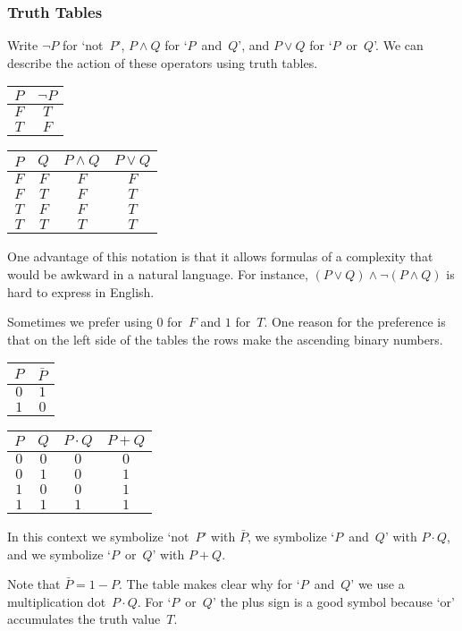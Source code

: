 \documentclass[10pt,t]{beamer}
\begin{document}
\begin{frame}
  \frametitle{Truth Tables}

Write $\neg P$ for `not~$P$', 
$P\wedge Q$ for `$P$~and~$Q$',
and $P\vee Q$ for `$P$~or~$Q$'.  
We can describe the action of these operators using \alert{truth tables}. 
\begin{center}
  \begin{tabular}[t]{c|c}
    $P$  &$\neg P$  \\ \hline
    $F$  &$T$  \\
    $T$  &$F$
  \end{tabular}
  \qquad
  \begin{tabular}[t]{cc|cc}
    $P$  &$Q$  &$P\wedge Q$  &$P\vee Q$  \\ \hline
    $F$  &$F$  &$F$          &$F$  \\
    $F$  &$T$  &$F$          &$T$  \\
    $T$  &$F$  &$F$          &$T$  \\
    $T$  &$T$  &$T$          &$T$  
  \end{tabular}
\end{center}

\pause
One advantage of this
notation is that it allows formulas of a complexity that would be awkward in
a natural language. 
For instance,
$(P\vee Q)\wedge \neg(P\wedge Q)$ is hard to express in 
English.
\end{frame}




\begin{frame}
Sometimes we prefer using $0$ for~$F$ and $1$ for~$T$.
One reason for the preference is that on 
the left side of the tables the rows make the ascending binary numbers.
\begin{center}
  \begin{tabular}[t]{c|c}
    $P$  &$\bar{P}$  \\ \hline
    $0$  &$1$  \\
    $1$  &$0$
  \end{tabular}
  \qquad
  \begin{tabular}[t]{cc|cc}
    $P$  &$Q$  &$P\cdot Q$  &$P+ Q$  \\ \hline
    $0$  &$0$  &$0$          &$0$  \\
    $0$  &$1$  &$0$          &$1$  \\
    $1$  &$0$  &$0$          &$1$  \\
    $1$  &$1$  &$1$          &$1$  
  \end{tabular}
\end{center}
In this context we symbolize `not~$P$' with $\bar{P}$,
we symbolize `$P$~and~$Q$' with $P\cdot Q$, and 
we symbolize `$P$~or~$Q$' with $P+Q$.

\pause
Note that $\bar{P}=1-P$.
The table makes clear why for `$P$~and~$Q$' we use a  
multiplication dot~$P\cdot Q$.
For `$P$~or~$Q$' the plus sign is a good symbol because 
`or' accumulates the truth value~$T$.
\end{frame}
\end{document}

